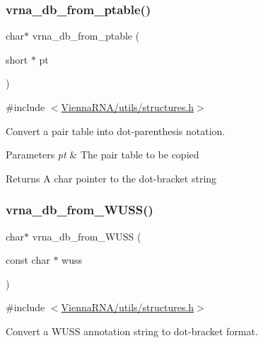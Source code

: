 \subsubsection{\texorpdfstring{vrna\_db\_from\_ptable()}{vrna\_db\_from\_ptable()}}
{\footnotesize\ttfamily char$\ast$ vrna\+\_\+db\+\_\+from\+\_\+ptable (\begin{DoxyParamCaption}\item[{short $\ast$}]{pt }\end{DoxyParamCaption})}



{\ttfamily \#include $<$\mbox{\hyperlink{utils_2structures_8h}{Vienna\+R\+N\+A/utils/structures.\+h}}$>$}



Convert a pair table into dot-\/parenthesis notation. 


\begin{DoxyParams}{Parameters}
{\em pt} & The pair table to be copied \\
\hline
\end{DoxyParams}
\begin{DoxyReturn}{Returns}
A char pointer to the dot-\/bracket string 
\end{DoxyReturn}
\mbox{\label{group__struct__utils__dot__bracket_ga02ca70cffb2d864f7b2d95d92218bae0}} 
\subsubsection{\texorpdfstring{vrna\_db\_from\_WUSS()}{vrna\_db\_from\_WUSS()}}
{\footnotesize\ttfamily char$\ast$ vrna\+\_\+db\+\_\+from\+\_\+\+W\+U\+SS (\begin{DoxyParamCaption}\item[{const char $\ast$}]{wuss }\end{DoxyParamCaption})}



{\ttfamily \#include $<$\mbox{\hyperlink{utils_2structures_8h}{Vienna\+R\+N\+A/utils/structures.\+h}}$>$}



Convert a W\+U\+SS annotation string to dot-\/bracket format. 

